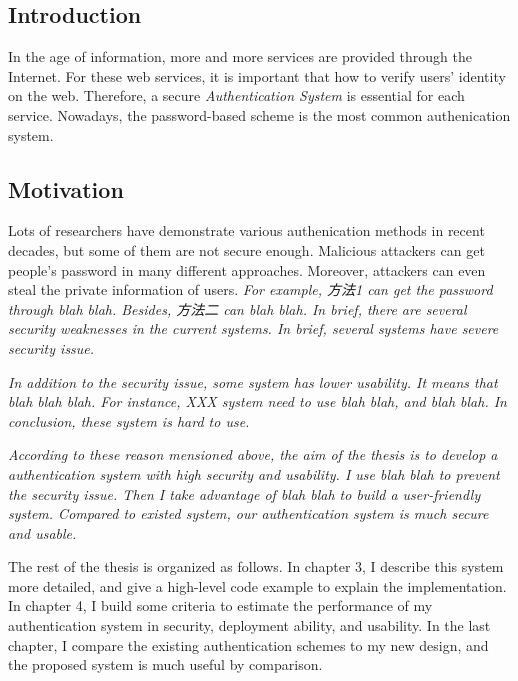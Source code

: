 
\begin{CJK}{Bg5}{bsmi}



\chapter{Introduction}
In the age of information, more and more services are provided through the Internet.
For these web services, it is important that how to verify users' identity on the web.
Therefore, a secure \emph{Authentication System} is essential for each service.
Nowadays, the password-based scheme is the most common authenication system.

\section{Motivation}
Lots of researchers have demonstrate various authenication methods in recent decades, but some of them are not secure enough.
Malicious attackers can get people's password in many different approaches.
Moreover, attackers can even steal the private information of users.
\emph{For example, 方法1 can get the password through blah blah.
Besides, 方法二 can blah blah. In brief, there are several security weaknesses in the current systems.
In brief, several systems have severe security issue.
}

\emph{
In addition to the security issue, some system has lower usability. It means that blah blah blah. For instance, XXX system need to use blah blah, and blah blah. In conclusion, these system is hard to use.
}

\emph{
According to these reason mensioned above, the aim of the thesis is to develop a authentication system with high security and usability. 
I use blah blah to prevent the security issue.
Then I take advantage of blah blah to build a user-friendly system.
Compared to existed system, our authentication system is much secure and usable.
}

The rest of the thesis is organized as follows.
In chapter 3, I describe this system more detailed, and give a high-level code example to explain the implementation.
In chapter 4, I build some criteria to estimate the performance of my authentication system in security, deployment ability, and usability.
In the last chapter, I compare the existing authentication schemes to my new design, and the proposed system is much useful by comparison.


\end{CJK}
